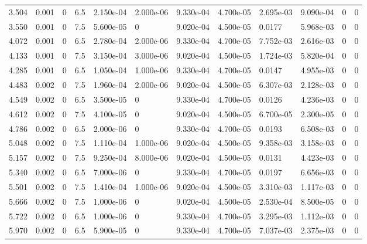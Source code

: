 \documentclass[preview]{standalone}
\begin{document}
{{\begin{tabular}{L{1.2cm}C{1.2cm} C{0.3cm}C{0.5cm} C{1.4cm}C{1.4cm} C{1.4cm}C{1.4cm} C{1.6cm}C{1.6cm} C{1.6cm}C{1.6cm}}
  3.504  &  0.001  & 0     & 6.5 &  2.150e-04  & 2.000e-06  &  9.330e-04&   4.700e-05& 2.695e-03 & 9.090e-04   &  0 & 0  \\ 
  3.550  &  0.001  & 0     & 7.5 &  5.600e-05  & 0  &  9.020e-04&   4.500e-05& 0.0177 & 5.968e-03   &  0 & 0  \\ 
  4.072  &  0.001  & 0     & 6.5 &  2.780e-04  & 2.000e-06  &  9.330e-04&   4.700e-05& 7.752e-03 & 2.616e-03   &  0 & 0  \\ 
  4.133  &  0.001  & 0     & 7.5 &  3.150e-04  & 3.000e-06  &  9.020e-04&   4.500e-05& 1.724e-03 & 5.820e-04   &  0 & 0  \\ 
  4.285  &  0.001  & 0     & 6.5 &  1.050e-04  & 1.000e-06  &  9.330e-04&   4.700e-05& 0.0147 & 4.955e-03   &  0 & 0  \\ 
  4.483  &  0.002  & 0     & 7.5 &  1.960e-04  & 2.000e-06  &  9.020e-04&   4.500e-05& 6.307e-03 & 2.128e-03   &  0 & 0  \\ 
  4.549  &  0.002  & 0     & 6.5 &  3.500e-05  & 0  &  9.330e-04&   4.700e-05& 0.0126 & 4.236e-03   &  0 & 0  \\ 
  4.612  &  0.002  & 0     & 7.5 &  4.100e-05  & 0  &  9.020e-04&   4.500e-05& 6.700e-05 & 2.300e-05   &  0 & 0  \\ 
  4.786  &  0.002  & 0     & 6.5 &  2.000e-06  & 0  &  9.330e-04&   4.700e-05& 0.0193 & 6.508e-03   &  0 & 0  \\ 
  5.048  &  0.002  & 0     & 7.5 &  1.110e-04  & 1.000e-06  &  9.020e-04&   4.500e-05& 9.358e-03 & 3.158e-03   &  0 & 0  \\ 
  5.157  &  0.002  & 0     & 7.5 &  9.250e-04  & 8.000e-06  &  9.020e-04&   4.500e-05& 0.0131 & 4.423e-03   &  0 & 0  \\ 
  5.340  &  0.002  & 0     & 6.5 &  7.000e-06  & 0  &  9.330e-04&   4.700e-05& 0.0197 & 6.656e-03   &  0 & 0  \\ 
  5.501  &  0.002  & 0     & 7.5 &  1.410e-04  & 1.000e-06  &  9.020e-04&   4.500e-05& 3.310e-03 & 1.117e-03   &  0 & 0  \\ 
  5.666  &  0.002  & 0     & 7.5 &  1.000e-06  & 0  &  9.020e-04&   4.500e-05& 2.530e-04 & 8.500e-05   &  0 & 0  \\ 
  5.722  &  0.002  & 0     & 6.5 &  1.000e-06  & 0  &  9.330e-04&   4.700e-05& 3.295e-03 & 1.112e-03   &  0 & 0  \\ 
  5.970  &  0.002  & 0     & 6.5 &  5.900e-05  & 0  &  9.330e-04&   4.700e-05& 7.037e-03 & 2.375e-03   &  0 & 0  \\ 
\hline 
\end{tabular} 

}}
\end{document}
